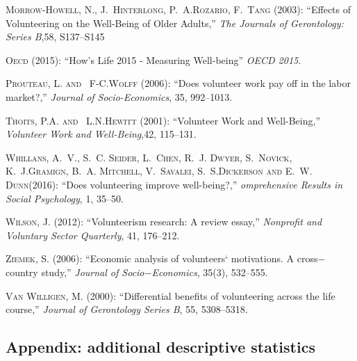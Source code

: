 \documentclass[10pt, letterpaper]{article}
\begin{document}
\begin{spacing}{1.4}
\begin{thebibliography}{87}
\textsc{Morrow-Howell, N., J.~Hinterlong, P.~A.Rozario, F.~Tang} (2003):
  \enquote{Effects of Volunteering on the Well-Being of Older Adults,} \emph{The Journals of Gerontology: Series B},58, S137--S145


\textsc{Oecd} (2015): \enquote{How's Life  2015 - Measuring Well-being} \emph{OECD 2015}.
  
\textsc{Prouteau, L. and ~F-C.Wolff } (2006): \enquote{Does volunteer work pay off in the labor market?,} \emph{Journal of Socio-Economics}, 35, 992--1013.

\textsc{Thoits, P.A. and ~L.N.Hewitt } (2001): \enquote{Volunteer Work and Well-Being,} \emph{Volunteer Work and Well-Being},42, 115--131.


\textsc{Whillans, A.~V., S.~C. Seider, L.~Chen, R.~J. Dwyer, S.~Novick, K.~J.Gramign, B.~A. Mitchell, V.~Savalei, S.~S.Dickerson and E.~W. Dunn}(2016):
  \enquote{Does volunteering improve well-being?,} \emph{omprehensive Results in Social Psychology}, 1, 35--50.

  
\textsc{Wilson, J.} (2012): \enquote{Volunteerism research: A
  review essay,} \emph{Nonprofit and Voluntary Sector Quarterly}, 41, 176--212.

\textsc{Ziemek, S.} (2006): \enquote{Economic analysis of volunteers` motivations. A cross$-$country study,} \emph{Journal of Socio$-$Economics}, 35(3), 532--555.


\textsc{Van Willigen, M.} (2000): \enquote{Differential benefits of volunteering across the life course,} \emph{Journal of Gerontology Series B}, 55, 5308--5318.


\end{thebibliography}


\begin{spacing}{.9}

\section{Appendix: additional descriptive statistics}


\end{spacing}
\end{spacing}
\end{document}
